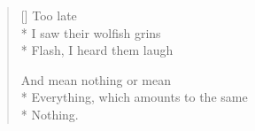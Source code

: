 \label{ch:lear_at}
\settowidth{\versewidth}{Everything, which amounts to the same}
\begin{verse}[\versewidth]
 \hspace*{3\vgap} Too late\\*
I saw their wolfish grins\\*
Flash, I heard them laugh

And mean nothing   or mean\\*
Everything, which amounts to the same\\*
Nothing.
\end{verse}
